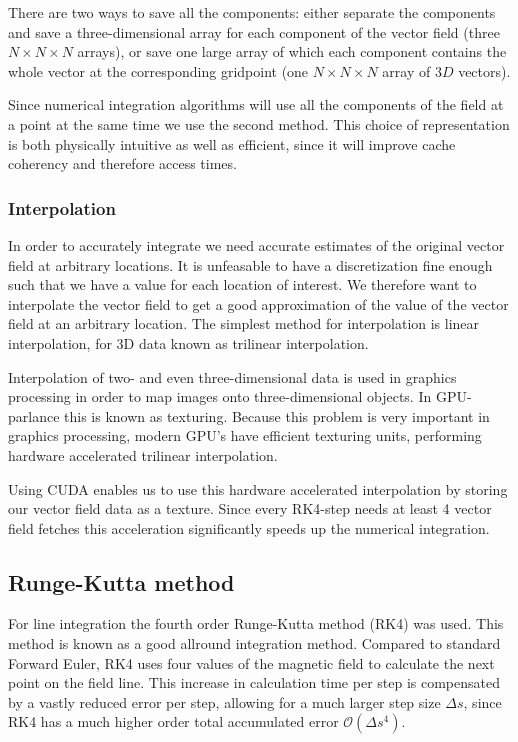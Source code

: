 \documentclass[a4paper]{article}
\renewcommand{\O}[1]{\ensuremath{\mathcal{O}\left(#1\right)}}
\begin{document}
There are two ways to save all the components: either separate the components and save a three-dimensional array for each component of the vector field (three $N\times N\times N$ arrays), or save one large array of which each component contains the whole vector at the corresponding gridpoint (one $N\times N\times N$ array of $3D$ vectors).

Since numerical integration algorithms will use all the components of the field at a point at the same time we use the second method. %
This choice of representation is both physically intuitive as well as efficient, since it will improve cache coherency and therefore access times.

\subsubsection{Interpolation}
In order to accurately integrate we need accurate estimates of the original vector field at arbitrary locations. 
It is unfeasable to have a discretization fine enough such that we have a value for each location of interest. 
We therefore want to interpolate the vector field to get a good approximation of the value of the vector field at an arbitrary location.
The simplest method for interpolation is linear interpolation, for 3D data known as trilinear interpolation.

Interpolation of two- and even three-dimensional data is used in graphics processing in order to map images onto three-dimensional objects. 
In GPU-parlance this is known as texturing. Because this problem is very important in graphics processing, modern GPU's have efficient texturing units, performing hardware accelerated trilinear interpolation.

Using CUDA enables us to use this hardware accelerated interpolation by storing our vector field data as a texture. 
Since every RK4-step needs at least 4 vector field fetches this acceleration significantly speeds up the numerical integration. %

\subsection{Runge-Kutta method}
For line integration the fourth order Runge-Kutta method (RK4) was used.  This method is known as a good allround integration method.
Compared to standard Forward Euler, RK4 uses four values of the magnetic field to calculate the next point on the field line. 
This increase in calculation time per step is compensated by a vastly reduced error per step, allowing for a much larger step size $\Delta s$, since RK4 has a much higher order total accumulated error $\O{\Delta s^4}$.
\end{document}
